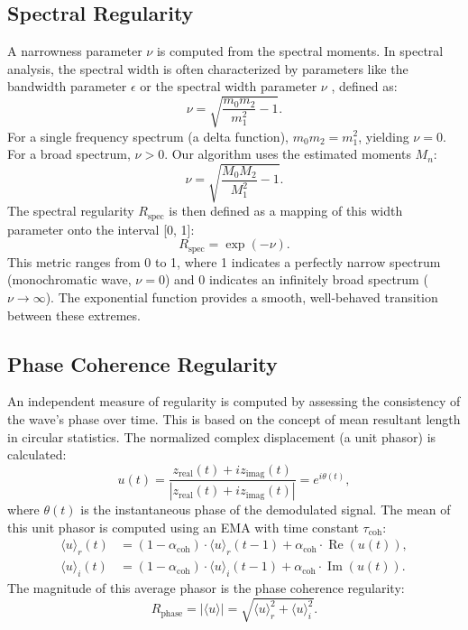 \documentclass[11pt]{article}
\begin{document}
\subsection{Spectral Regularity}
A narrowness parameter $\nu$ is computed from the spectral moments. In spectral analysis, the spectral width is often characterized by parameters like the bandwidth parameter $\epsilon$ or the spectral width parameter $\nu$ \cite{longuet-higgins1975}, defined as:
\begin{equation}
\nu = \sqrt{ \frac{m_0 m_2}{m_1^2} - 1 }.
\end{equation}
For a single frequency spectrum (a delta function), $m_0 m_2 = m_1^2$, yielding $\nu = 0$. For a broad spectrum, $\nu > 0$. Our algorithm uses the estimated moments $M_n$:
\begin{equation}
\nu = \sqrt{ \frac{M_0 M_2}{M_1^2} - 1 }.
\end{equation}
The spectral regularity $R_{\text{spec}}$ is then defined as a mapping of this width parameter onto the interval [0, 1]:
\begin{equation}
R_{\text{spec}} = \exp(-\nu).
\end{equation}
This metric ranges from 0 to 1, where 1 indicates a perfectly narrow spectrum (monochromatic wave, $\nu=0$) and 0 indicates an infinitely broad spectrum ($\nu \to \infty$). The exponential function provides a smooth, well-behaved transition between these extremes.

\subsection{Phase Coherence Regularity}
An independent measure of regularity is computed by assessing the consistency of the wave's phase over time. This is based on the concept of mean resultant length in circular statistics. The normalized complex displacement (a unit phasor) is calculated:
\begin{equation}
u(t) = \frac{z_{\text{real}}(t) + i z_{\text{imag}}(t)}{|z_{\text{real}}(t) + i z_{\text{imag}}(t)|} = e^{i\theta(t)},
\end{equation}
where $\theta(t)$ is the instantaneous phase of the demodulated signal. The mean of this unit phasor is computed using an EMA with time constant $\tau_{\text{coh}}$:
\begin{align}
\langle u \rangle_r(t) &= (1 - \alpha_{\text{coh}}) \cdot \langle u \rangle_r(t-1) + \alpha_{\text{coh}} \cdot \operatorname{Re}(u(t)), \\
\langle u \rangle_i(t) &= (1 - \alpha_{\text{coh}}) \cdot \langle u \rangle_i(t-1) + \alpha_{\text{coh}} \cdot \operatorname{Im}(u(t)).
\end{align}
The magnitude of this average phasor is the phase coherence regularity:
\begin{equation}
R_{\text{phase}} = | \langle u \rangle | = \sqrt{ \langle u \rangle_r^2 + \langle u \rangle_i^2 }.
\end{equation}
\end{document}
